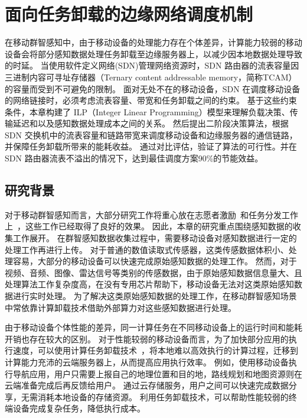 \chapter{面向任务卸载的边缘网络调度机制}

在移动群智感知中，由于移动设备的处理能力存在个体差异，计算能力较弱的移动设备会将部分感知数据处理任务卸载至边缘服务器上，以减少因本地数据处理导致的时延。
当使用软件定义网络(SDN)管理网络资源时，SDN 路由器的流表容量因三进制内容可寻址存储器（Ternary content addressable memory，简称TCAM）的容量而受到不可避免的限制。
面对无处不在的移动设备，SDN 在调度移动设备的网络链接时，必须考虑流表容量、带宽和任务卸载之间的约束。
基于这些约束条件，本章构建了 ILP（Integer Linear Programming）模型来理解负载决策、传输延迟和以及感知数据处理成本之间的关系。
然后提出二阶段决策算法，根据 SDN 交换机中的流表容量和链路带宽来调度移动设备和边缘服务器的通信链路，并保障任务卸载所带来的能耗收益。
通过对比评估，验证了算法的可行性。并在 SDN 路由器流表不溢出的情况下，达到最佳调度方案90\%的节能效益。

\section{研究背景}

对于移动群智感知而言，大部分研究工作将重心放在志愿者激励~\cite{CNKI:JiaChaopeng, DBLP:journals/comsur/ZhangYSLTXM16, CNKI:WuMCSIncentive}和任务分发工作上~\cite{DBLP:conf/huc/LiuGWWYZ16, DBLP:conf/infocom/Xiao0HWL15, DBLP:conf/mass/LiLW15}，这些工作已经取得了良好的效果。
因此，本章的研究重点围绕感知数据的收集工作展开。
在群智感知数据收集过程中，需要移动设备对感知数据进行一定的处理工作再进行上传。
对于普通的数值读取式传感器，这类传感数据体积小、处理容易，大部分的移动设备可以快速完成原始感知数据的处理工作。
然而，对于视频、音频、图像、雷达信号等类别的传感数据，由于原始感知数据信息量大、且处理算法工作复杂度高，在没有专用芯片帮助下，移动设备无法对这类原始感知数据进行实时处理。
为了解决这类原始感知数据的处理工作，在移动群智感知场景中常依靠计算卸载技术借助外部算力对这些感知数据进行处理。

由于移动设备个体性能的差异，同一计算任务在不同移动设备上的运行时间和能耗开销也存在较大的区别。
对于性能较弱的移动设备而言，为了加快部分应用的执行速度，可以使用计算任务卸载技术~\cite{Lee:2013fj, Linthicum:2017vv, Kumar:2013dq}，将本地难以高效执行的计算过程，迁移到计算能力充沛的云端服务器上，从而提高应用执行效率。
例如，使用移动设备执行导航应用，用户只需要上报自己的地理位置和目的地，路线规划和地图资源则在云端准备完成后再反馈给用户。
通过云存储服务，用户之间可以快速完成数据分享，无需消耗本地设备的存储资源。
利用任务卸载技术，可以帮助性能较弱的终端设备完成复杂任务，降低执行成本。

